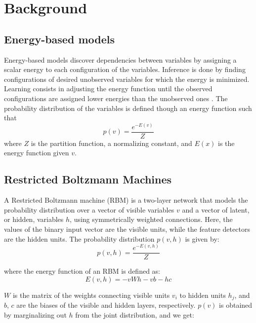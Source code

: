 \documentclass{report}
\begin{document}
\section{Background}
\subsection{Energy-based models}
Energy-based models discover dependencies between variables by assigning a scalar energy to each configuration of the variables. Inference is done by finding configurations of desired unobserved variables for which the energy is minimized. Learning consists in adjusting the energy function until the observed configurations are assigned lower energies than the unobserved ones \cite{LeCun}. The probability distribution of the variables is defined though an energy function such that
\begin{equation}
p(v) = \frac{e^{-E(v)}}{Z}
\end{equation}
where $Z$ is the partition function, a normalizing constant, and $E(x)$ is the energy function given $v$.

\subsection{Restricted Boltzmann Machines}

A Restricted Boltzmann machine (RBM) is a two-layer network that models the probability distribution over a vector of visible variables $v$ and a vector of latent, or hidden, variables $h$, using symmetrically weighted connections\cite{Mnih}. Here, the values of the binary input vector are the visible units, while the feature detectors are the hidden units. The probability distribution $p(v,h)$ is given by:
\begin{equation}
p(v,h) = \frac{e^{-E(v,h)}}{Z}
\end{equation}

where the energy function of an RBM is defined as:
\begin{equation}
E(v, h) = -vWh - vb - hc
\end{equation}

$W$ is the matrix of the weights connecting visible units $v_i$ to hidden units $h_j$, and $b$, $c$ are the biases of the visible and hidden layers, respectively. $p(v)$ is obtained by marginalizing out $h$ from the joint distribution, and we get:
\end{document}
